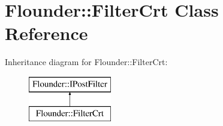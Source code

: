 \hypertarget{class_flounder_1_1_filter_crt}{}\section{Flounder\+:\+:Filter\+Crt Class Reference}
\label{class_flounder_1_1_filter_crt}
Inheritance diagram for Flounder\+:\+:Filter\+Crt\+:\begin{figure}[H]
\begin{center}
\leavevmode
\includegraphics[height=2.000000cm]{class_flounder_1_1_filter_crt}
\end{center}
\end{figure}
